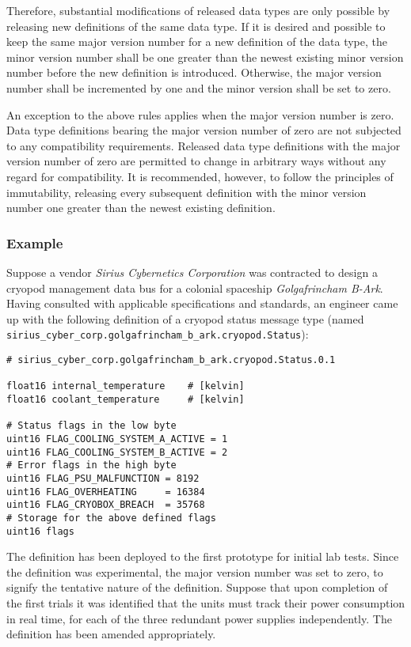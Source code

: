 Therefore, substantial modifications of released data types are only possible by releasing
new definitions of the same data type.
If it is desired and possible to keep the same major version number for a new definition of the data type,
the minor version number shall be one greater than the newest existing minor version
number before the new definition is introduced.
Otherwise, the major version number shall be incremented by one and the minor version shall be set to zero.

An exception to the above rules applies when the major version number is zero.
Data type definitions bearing the major version number of zero are not subjected to any compatibility requirements.
Released data type definitions with the major version number of zero are permitted to change in arbitrary
ways without any regard for compatibility.
It is recommended, however, to follow the principles of immutability, releasing every subsequent definition
with the minor version number one greater than the newest existing definition.

\subsubsection{Example}

Suppose a vendor \emph{Sirius Cybernetics Corporation} was contracted to design a cryopod management data bus for a
colonial spaceship \emph{Golgafrincham B-Ark}.
Having consulted with applicable specifications and standards, an engineer came up with the following
definition of a cryopod status message type (named \verb|sirius_cyber_corp.golgafrincham_b_ark.cryopod.Status|):

\begin{verbatim}
# sirius_cyber_corp.golgafrincham_b_ark.cryopod.Status.0.1

float16 internal_temperature    # [kelvin]
float16 coolant_temperature     # [kelvin]

# Status flags in the low byte
uint16 FLAG_COOLING_SYSTEM_A_ACTIVE = 1
uint16 FLAG_COOLING_SYSTEM_B_ACTIVE = 2
# Error flags in the high byte
uint16 FLAG_PSU_MALFUNCTION = 8192
uint16 FLAG_OVERHEATING     = 16384
uint16 FLAG_CRYOBOX_BREACH  = 35768
# Storage for the above defined flags
uint16 flags
\end{verbatim}

The definition has been deployed to the first prototype for initial lab tests.
Since the definition was experimental, the major version number was set to zero, to signify the
tentative nature of the definition.
Suppose that upon completion of the first trials it was identified that the units must track their power consumption
in real time, for each of the three redundant power supplies independently.
The definition has been amended appropriately.

